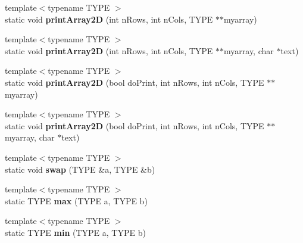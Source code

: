 \begin{DoxyCompactItemize}
\item 
\mbox{\label{class_k_w_util_a0d00bcaaee4bf9fe1ea3f28c39db766d}} 
{\footnotesize template$<$typename T\+Y\+PE $>$ }\\static void {\bfseries print\+Array2D} (int n\+Rows, int n\+Cols, T\+Y\+PE $\ast$$\ast$myarray)
\item 
\mbox{\label{class_k_w_util_a8ca8f9d0826b637aee5285af196431a0}} 
{\footnotesize template$<$typename T\+Y\+PE $>$ }\\static void {\bfseries print\+Array2D} (int n\+Rows, int n\+Cols, T\+Y\+PE $\ast$$\ast$myarray, char $\ast$text)
\item 
\mbox{\label{class_k_w_util_a2907060d81976090c40829107159666d}} 
{\footnotesize template$<$typename T\+Y\+PE $>$ }\\static void {\bfseries print\+Array2D} (bool do\+Print, int n\+Rows, int n\+Cols, T\+Y\+PE $\ast$$\ast$myarray)
\item 
\mbox{\label{class_k_w_util_a59aabe5a32605da8367ca84c3ad3a0ab}} 
{\footnotesize template$<$typename T\+Y\+PE $>$ }\\static void {\bfseries print\+Array2D} (bool do\+Print, int n\+Rows, int n\+Cols, T\+Y\+PE $\ast$$\ast$myarray, char $\ast$text)
\item 
\mbox{\label{class_k_w_util_a6ed5d213169247c4b3fe3ed2fb96dd88}} 
{\footnotesize template$<$typename T\+Y\+PE $>$ }\\static void {\bfseries swap} (T\+Y\+PE \&a, T\+Y\+PE \&b)
\item 
\mbox{\label{class_k_w_util_a707d699ad01c87ba21e06fe28de85712}} 
{\footnotesize template$<$typename T\+Y\+PE $>$ }\\static T\+Y\+PE {\bfseries max} (T\+Y\+PE a, T\+Y\+PE b)
\item 
\mbox{\label{class_k_w_util_af1b3640361810ba75435a850d73a2413}} 
{\footnotesize template$<$typename T\+Y\+PE $>$ }\\static T\+Y\+PE {\bfseries min} (T\+Y\+PE a, T\+Y\+PE b)
\item 
\mbox{\label{class_k_w_util_abe27306f912197863466e7c68d3c66fb}} 

\end{DoxyCompactItemize}

